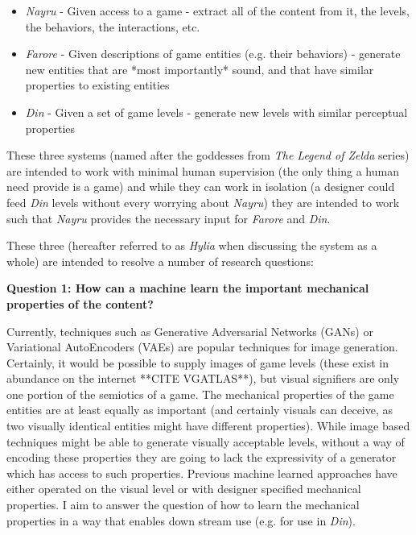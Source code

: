 \documentclass[a4paper]{article}
\begin{document}
\begin{itemize}
\item \textit{Nayru} - Given access to a game - extract all of the content from it, the levels, the behaviors, the interactions, etc.
\item \textit{Farore} - Given descriptions of game entities (e.g. their behaviors) - generate new entities that are *most importantly* sound, and that have similar properties to existing entities
\item \textit{Din} - Given a set of game levels - generate new levels with similar perceptual properties

\end{itemize}

These three systems (named after the goddesses from \textit{The Legend of Zelda} series) are intended to work with minimal human supervision (the only thing a human need provide is a game) and while they can work in isolation (a designer could feed \textit{Din} levels without every worrying about \textit{Nayru}) they are intended to work such that \textit{Nayru} provides the necessary input for \textit{Farore} and \textit{Din}.  

These three (hereafter referred to as \textit{Hylia} when discussing the system as a whole) are intended to resolve a number of research questions:

\textbf{Question 1: How can a machine learn the important mechanical properties of the content?}

Currently, techniques such as Generative Adversarial Networks (GANs) or Variational AutoEncoders (VAEs) are popular techniques for image generation.  Certainly, it would be possible to supply images of game levels (these exist in abundance on the internet **CITE VGATLAS**), but visual signifiers are only one portion of the semiotics of a game.  The mechanical properties of the game entities are at least equally as important (and certainly visuals can deceive, as two visually identical entities might have different properties).  While image based techniques might be able to generate visually acceptable levels, without a way of encoding these properties they are going to lack the expressivity of a generator which has access to such properties.  Previous machine learned approaches have either operated on the visual level or with designer specified mechanical properties.   I aim to answer the question of how to learn the mechanical properties in a way that enables down stream use (e.g. for use in \textit{Din}).
\end{document}
